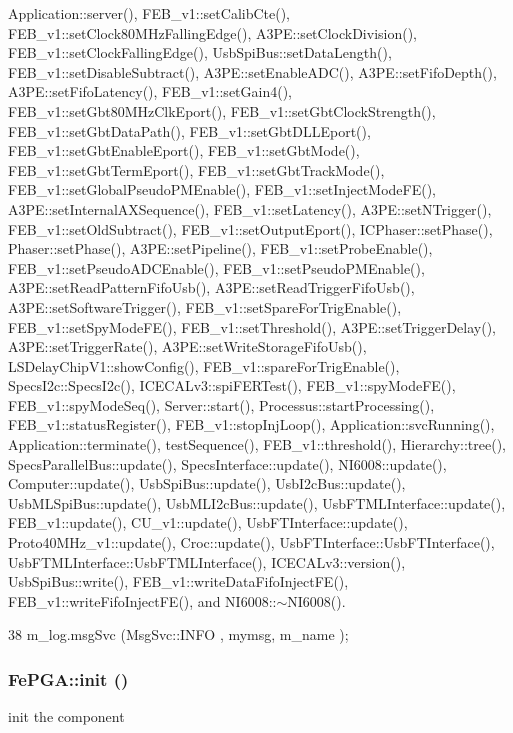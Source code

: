 Application::server(), FEB\_\-v1::setCalibCte(), FEB\_\-v1::setClock80MHzFallingEdge(), A3PE::setClockDivision(), FEB\_\-v1::setClockFallingEdge(), UsbSpiBus::setDataLength(), FEB\_\-v1::setDisableSubtract(), A3PE::setEnableADC(), A3PE::setFifoDepth(), A3PE::setFifoLatency(), FEB\_\-v1::setGain4(), FEB\_\-v1::setGbt80MHzClkEport(), FEB\_\-v1::setGbtClockStrength(), FEB\_\-v1::setGbtDataPath(), FEB\_\-v1::setGbtDLLEport(), FEB\_\-v1::setGbtEnableEport(), FEB\_\-v1::setGbtMode(), FEB\_\-v1::setGbtTermEport(), FEB\_\-v1::setGbtTrackMode(), FEB\_\-v1::setGlobalPseudoPMEnable(), FEB\_\-v1::setInjectModeFE(), A3PE::setInternalAXSequence(), FEB\_\-v1::setLatency(), A3PE::setNTrigger(), FEB\_\-v1::setOldSubtract(), FEB\_\-v1::setOutputEport(), ICPhaser::setPhase(), Phaser::setPhase(), A3PE::setPipeline(), FEB\_\-v1::setProbeEnable(), FEB\_\-v1::setPseudoADCEnable(), FEB\_\-v1::setPseudoPMEnable(), A3PE::setReadPatternFifoUsb(), A3PE::setReadTriggerFifoUsb(), A3PE::setSoftwareTrigger(), FEB\_\-v1::setSpareForTrigEnable(), FEB\_\-v1::setSpyModeFE(), FEB\_\-v1::setThreshold(), A3PE::setTriggerDelay(), A3PE::setTriggerRate(), A3PE::setWriteStorageFifoUsb(), LSDelayChipV1::showConfig(), FEB\_\-v1::spareForTrigEnable(), SpecsI2c::SpecsI2c(), ICECALv3::spiFERTest(), FEB\_\-v1::spyModeFE(), FEB\_\-v1::spyModeSeq(), Server::start(), Processus::startProcessing(), FEB\_\-v1::statusRegister(), FEB\_\-v1::stopInjLoop(), Application::svcRunning(), Application::terminate(), testSequence(), FEB\_\-v1::threshold(), Hierarchy::tree(), SpecsParallelBus::update(), SpecsInterface::update(), NI6008::update(), Computer::update(), UsbSpiBus::update(), UsbI2cBus::update(), UsbMLSpiBus::update(), UsbMLI2cBus::update(), UsbFTMLInterface::update(), FEB\_\-v1::update(), CU\_\-v1::update(), UsbFTInterface::update(), Proto40MHz\_\-v1::update(), Croc::update(), UsbFTInterface::UsbFTInterface(), UsbFTMLInterface::UsbFTMLInterface(), ICECALv3::version(), UsbSpiBus::write(), FEB\_\-v1::writeDataFifoInjectFE(), FEB\_\-v1::writeFifoInjectFE(), and NI6008::$\sim$NI6008().


\begin{DoxyCode}
38 { m_log.msgSvc (MsgSvc::INFO    , mymsg, m_name ); }
\end{DoxyCode}
\hypertarget{classFePGA_a5355858b1b8deedcc12acff80f025804}{
\subsubsection[{init}]{ FePGA::init ()}}
\label{classFePGA_a5355858b1b8deedcc12acff80f025804}
init the component

